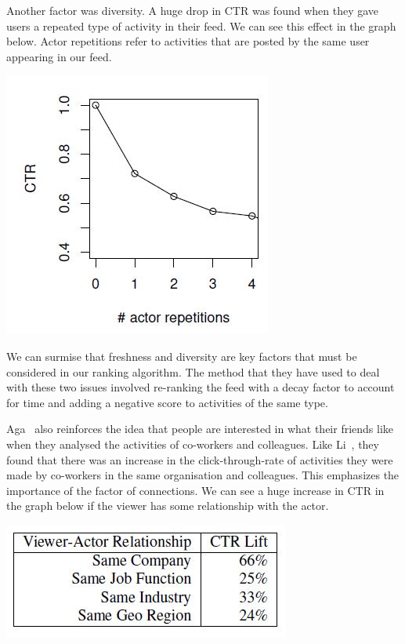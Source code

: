 Another factor was diversity. A huge drop in CTR was found when they gave users a repeated type of activity in their feed. We can see this effect in the graph below. Actor repetitions refer to activities that are posted by the same user appearing in our feed.

\begin{center}
\includegraphics[scale=0.8]{images/diversity.jpg}
\end{center}

We can surmise that freshness and diversity are key factors that must be considered in our ranking algorithm. The method that they have used to deal with these two issues involved re-ranking the feed with a decay factor to account for time and adding a negative score to activities of the same type. 

Aga~\cite{Aga2014} also reinforces the idea that people are interested in what their friends like when they analysed the activities of co-workers and colleagues. Like Li~\cite{LiTiaLee2010}, they found that there was an increase in the click-through-rate of activities they were made by co-workers in the same organisation and colleagues. This emphasizes the importance of the factor of connections. We can see a huge increase in CTR in the graph below if the viewer has some relationship with the actor.

\begin{center}
\includegraphics[scale=0.8]{images/connections.jpg}
\end{center}
